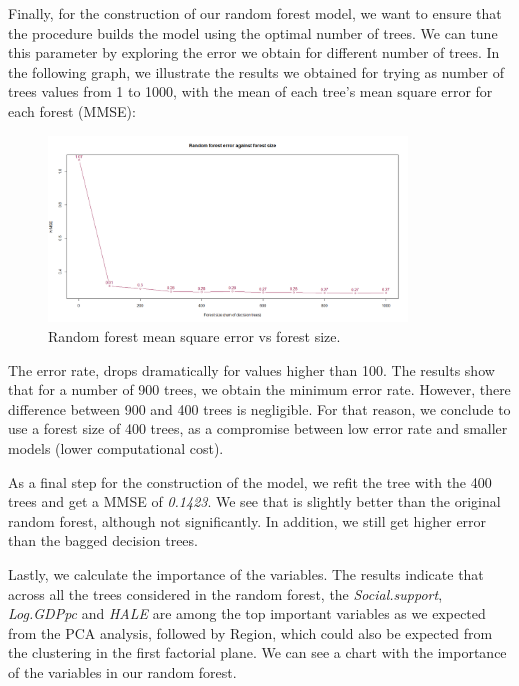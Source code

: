 \documentclass[12pt]{extarticle}
\begin{document}
Finally, for the construction of our random forest model, we want to ensure that the procedure builds the model using the optimal number of trees. We can tune this parameter by exploring the error we obtain for different number of trees. In the following graph, we illustrate the results we obtained for trying as number of trees values from 1 to 1000, with the mean of each tree’s mean square error for each forest (MMSE):

\begin{figure}[H]
  \centering
    \includegraphics[width=0.85\textwidth]{figures/random-error-size.png}
    \caption{Random forest mean square error vs forest size.\label{fig:random-error-size}}
\end{figure}

The error rate, drops dramatically for values higher than 100. The results show that for a number of 900 trees, we obtain the minimum error rate. However, there difference between 900 and 400 trees is negligible. For that reason, we conclude to use a forest size of 400 trees, as a compromise between low error rate and smaller models (lower computational cost).

As a final step for the construction of the model, we refit the tree with the 400 trees and get a MMSE of \textit{0.1423}. We see that is slightly better than the original random forest, although not significantly. In addition, we still get higher error than the bagged decision trees.

Lastly, we calculate the importance of the variables. The results indicate that across all the trees considered in the random forest, the \textit{Social.support}, \textit{Log.GDPpc} and \textit{HALE} are among the top important variables as we expected from the PCA analysis, followed by Region, which could also be expected from the clustering in the first factorial plane. We can see a chart with the importance of the variables in our random forest.
\end{document}
